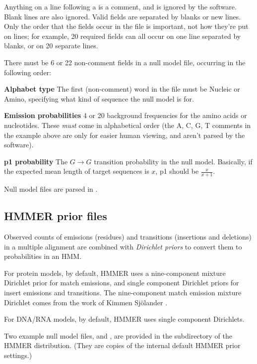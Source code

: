 Anything on a line following a \prog{\#} is a comment, and is ignored
by the software. Blank lines are also ignored. Valid fields are
separated by blanks or new lines. Only the order that the fields occur
in the file is important, not how they're put on lines; for example,
20 required fields can all occur on one line separated by blanks, or
on 20 separate lines. 

There must be 6 or 22 non-comment fields in a null model file,
occurring in the following order:

\begin{wideitem}
\item [\textbf{Alphabet type}] The first (non-comment) word in the
file must be Nucleic or Amino, specifying what kind of sequence the
null model is for.

\item [\textbf{Emission probabilities}] 4 or 20 background
frequencies for the amino acids or nucleotides. These \textit{must}
come in alphabetical order (the A, C, G, T comments in the example
above are only for easier human viewing, and aren't parsed by the
software).

\item [\textbf{p1 probability}] The $G \rightarrow G$ transition
probability in the null model. Basically, if the expected mean length
of target sequences is $x$, p1 should be $\frac{x}{x+1}$.
\end{wideitem}

Null model files are parsed in .

\subsection{HMMER prior files}
\label{section:priorfiles}

Observed counts of emissions (residues) and transitions (insertions
and deletions) in a multiple alignment are combined with
\textit{Dirichlet priors} to convert them to probabilities
in an HMM. 

For protein models, by default, HMMER uses a nine-component mixture
Dirichlet prior for match emissions, and single component Dirichlet
priors for insert emissions and transitions. The nine-component match
emission mixture Dirichlet comes from the work of Kimmen Sj\"{o}lander
\cite{Sjolander96}.

For DNA/RNA models, by default, HMMER uses single component
Dirichlets.

Two example null model files,  and ,
are provided in the  subdirectory of the HMMER
distribution. (They are copies of the internal default HMMER prior
settings.)

